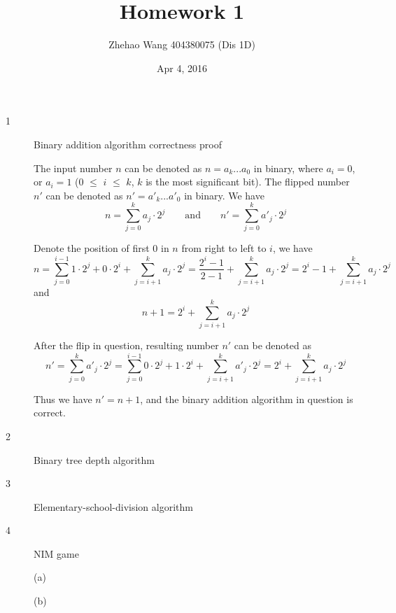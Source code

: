 \documentclass{article}
\title{Homework 1}
\author{Zhehao Wang 404380075 (Dis 1D)}
\date{Apr 4, 2016}
\begin{document}
\maketitle

\begin{description}

\item[1]{Binary addition algorithm correctness proof}
  
  The input number $n$ can be denoted as $n=a_k...a_0$ in binary, where $a_i=0$, or $a_i=1$ ($0$ $\leq$ $i$ $\leq$ $k$, $k$ is the most significant bit). The flipped number $n'$ can be denoted as  $n'=a'_k...a'_0$ in binary.
  We have 
  \[
  n = \sum_{j=0}^{k}{a_j \cdot 2^j}
  \qquad \text{and} \qquad 
  n' = \sum_{j=0}^{k}{a'_j \cdot 2^j}
  \]
  
  Denote the position of first $0$ in $n$ from right to left to $i$, we have 
  $$n = \sum_{j=0}^{i-1}{1 \cdot 2^j} + 0 \cdot 2^i + \sum_{j=i+1}^{k}{a_j \cdot 2^j} = \frac{2^i-1}{2-1} + \sum_{j=i+1}^{k}{a_j \cdot 2^j} = 2^i - 1 + \sum_{j=i+1}^{k}{a_j \cdot 2^j}$$ 
  and
  $$n + 1 = 2^i + \sum_{j=i+1}^{k}{a_j \cdot 2^j}$$

  After the flip in question, resulting number $n'$ can be denoted as
  $$n' = \sum_{j=0}^{k}{a'_j \cdot 2^j} = \sum_{j=0}^{i-1}{0 \cdot 2^j} + 1 \cdot 2^i + \sum_{j=i+1}^{k}{a'_j \cdot 2^j} = 2^i + \sum_{j=i+1}^{k}{a_j \cdot 2^j}$$

  Thus we have $n' = n + 1$, and the binary addition algorithm in question is correct.

\item[2]{Binary tree depth algorithm}

 

\item[3]{Elementary-school-division algorithm}

\item[4]{NIM game}

(a)

(b)

\end{description}
\end{document}
